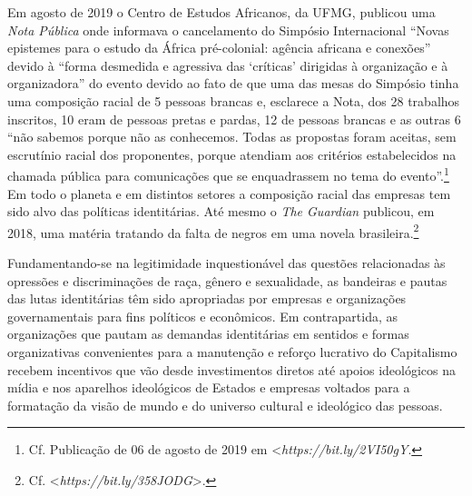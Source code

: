 Em agosto de 2019 o Centro de Estudos Africanos, da UFMG, publicou uma
\emph{Nota Pública} onde informava o cancelamento do Simpósio
Internacional ``Novas epistemes para o estudo da África pré-colonial:
agência africana e conexões'' devido à ``forma desmedida e agressiva das
`críticas' dirigidas à organização e à organizadora'' do evento devido
ao fato de que uma das mesas do Simpósio tinha uma composição racial de
5 pessoas brancas e, esclarece a Nota, dos 28 trabalhos inscritos, 10
eram de pessoas pretas e pardas, 12 de pessoas brancas e as outras 6
``não sabemos porque não as conhecemos. Todas as propostas foram
aceitas, sem escrutínio racial dos proponentes, porque atendiam aos
critérios estabelecidos na chamada pública para comunicações que se
enquadrassem no tema do evento''.\footnote{Cf. Publicação de 06 de
  agosto de 2019 em
  \textless{}\emph{https://bit.ly/2VI50gY}\textgreter{}.}
Em todo o planeta e em distintos setores a composição racial das
empresas tem sido alvo das políticas identitárias. Até mesmo o \emph{The
Guardian} publicou, em 2018, uma matéria tratando da falta de negros em
uma novela brasileira.\footnote{Cf.
  \textless{}\emph{https://bit.ly/358JODG}\textgreater{}.}

Fundamentando-se na legitimidade inquestionável das questões
relacionadas às opressões e discriminações de raça, gênero e
sexualidade, as bandeiras e pautas das lutas identitárias têm sido
apropriadas por empresas e organizações governamentais para fins
políticos e econômicos. Em contrapartida, as organizações que pautam as
demandas identitárias em sentidos e formas organizativas convenientes
para a manutenção e reforço lucrativo do Capitalismo recebem incentivos
que vão desde investimentos diretos até apoios ideológicos na mídia e
nos aparelhos ideológicos de Estados e empresas voltados para a
formatação da visão de mundo e do universo cultural e ideológico das
pessoas.

